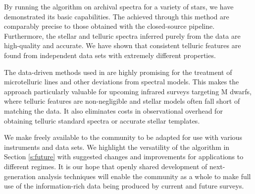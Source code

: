 \documentclass[twocolumn]{aastex62}
\begin{document}
By running the \wobble algorithm on archival \HARPS spectra for a variety of stars, we have demonstrated its basic capabilities. 
The \RVs achieved through this method are comparably precise to those obtained with the closed-source \HARPS pipeline. 
Furthermore, the stellar and telluric spectra inferred purely from the data are high-quality and accurate. 
We have shown that consistent telluric features are found from independent data sets with extremely different properties. 

The data-driven methods used in \wobble are highly promising for the treatment of microtelluric lines and other deviations from spectral models. 
This makes the approach particularly valuable for upcoming infrared surveys targeting M dwarfs, where telluric features are non-negligible and stellar models often fall short of matching the data. 
It also eliminates costs in observational overhead for obtaining telluric standard spectra or accurate stellar templates.

We make \wobble freely available to the \RV community to be adapted for use with various instruments and data sets. 
We highlight the versatility of the algorithm in Section \ref{s:future} with suggested changes and improvements for applications to different regimes. 
It is our hope that openly shared development of next-generation  analysis techniques will enable the community as a whole to make full use of the information-rich data being produced by current and future \EPRV surveys.




\end{document}
